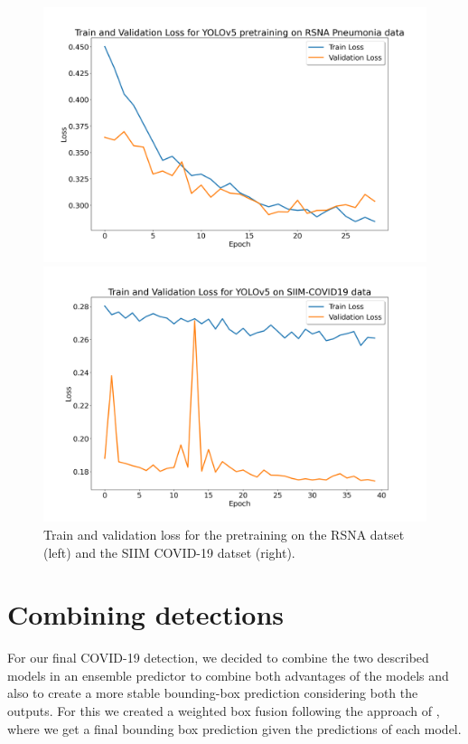 \begin{figure}[h!]
	\centering
	\begin{minipage}{.5\textwidth}
		\centering
		\includegraphics[width=\linewidth]{img/loss_yolo_30.png}
	\end{minipage}%
	\begin{minipage}{0.5\textwidth}
		\centering
		\includegraphics[width=\linewidth]{img/loss_yolo_giou_40_siim.png}
	\end{minipage}
\caption{Train and validation loss for the pretraining on the RSNA datset (left) and the SIIM COVID-19 datset (right).}
\label{fig:yolo_losses}
\end{figure}
\newpage
\section{Combining detections}
For our final COVID-19 detection, we decided to combine the two described models in an ensemble predictor to combine both advantages of the models and also to create a more stable bounding-box prediction considering both the outputs. For this we created a weighted box fusion following the approach of \citeauthor{weightedBoxFusion} \autocite{weightedBoxFusion}, where we get a final bounding box prediction given the predictions of each model.

